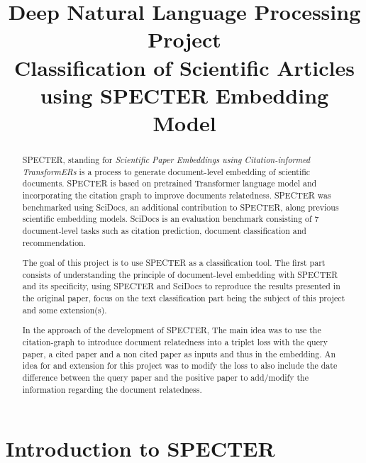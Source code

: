 \documentclass[conference]{IEEEtran}
\begin{document}
\title{Deep Natural Language Processing Project\\Classification of Scientific Articles using SPECTER Embedding Model}

\author{
}
\maketitle

\begin{abstract}
SPECTER, standing for \textit{Scientific Paper Embeddings using Citation-informed TransformERs} is a process to generate document-level embedding of scientific documents. SPECTER is based on pretrained Transformer language model and incorporating the citation graph to improve documents relatedness. SPECTER was benchmarked using SciDocs, an additional contribution to SPECTER, along previous scientific embedding models. SciDocs is an evaluation benchmark consisting of 7 document-level tasks such as citation prediction, document classification and recommendation. 

The goal of this project is to use SPECTER as a classification tool. The first part consists of understanding the principle of document-level embedding with SPECTER and its specificity, using SPECTER and SciDocs to reproduce the results presented in the original paper, focus on the text classification part being the subject of this project and some extension(s). 

In the approach of the development of SPECTER, The main idea was to use the citation-graph to introduce document relatedness into a triplet loss with  the query paper, a cited paper and a non cited paper as inputs and thus in the embedding. An idea for and extension for this project was to modify the loss to also include the date difference between the query paper and the positive paper to add/modify the information regarding the document relatedness.
\end{abstract}

\section{Introduction to SPECTER}
\end{document}
